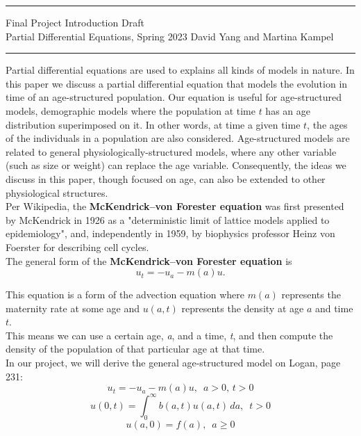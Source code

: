 \documentclass[11pt]{article}
\begin{document}
	\hrule
	\begin{center}
		{\Large Final Project Introduction Draft} \\ %
		\vspace{0.2cm}
		Partial Differential Equations, Spring 2023 \hfill David Yang and Martina Kampel%
	\end{center}

\hrule

\vspace{1em}

Partial differential equations are used to explains all kinds of models in nature. In this paper we discuss a partial differential equation that models the evolution in time of an age-structured population. Our equation is useful for age-structured models,  demographic models where the population at time $t$ has an age distribution superimposed on it. In other words, at time a given time $t$, the ages of the individuals in a population are also considered. Age-structured models are related to general physiologically-structured models, where any other variable (such as size or weight) can replace the age variable. Consequently, the ideas we discuss in this paper, though focused on age, can also be extended to other physiological structures. \\


Per Wikipedia, the \textbf{McKendrick–von Forester equation} was first presented by McKendrick in 1926 as a "deterministic limit of lattice models applied to epidemiology", and, independently in 1959, by biophysics professor Heinz von Foerster for describing cell cycles. \\

The general form of the \textbf{McKendrick–von Forester equation} is
    \[ u_t = -u_a - m(a)u. \]
    
This equation is a form of the advection equation where $m(a)$ represents the maternity rate at some age and $u(a, t)$ represents the density at age $a$ and time $t$. \\

This means we can use a certain age, \textit{a}, and a time, \textit{t}, and then compute the density of the population of that particular age at that time. \\


In our project, we will derive the general age-structured model on Logan, page 231:
\[ u_t = -u_a-m(a)u, \, \, \, a>0, \, t>0\]
\[ u(0,t) = \int_0^{\infty}b(a,t)u(a, t) \, da, \, \, \, t>0\]
\[ u(a, 0)=f(a), \, \, \, a \geq 0\]
\end{document}
